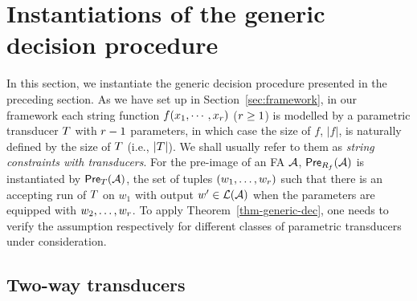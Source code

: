 
\section{Instantiations of the generic decision procedure}\label{sec-instan}

In this section, we instantiate the generic decision procedure presented in the preceding section. 
As we have set up in Section~\ref{sec:framework}, in our framework %
each string function $f(x_1, \cdots, x_r)$ ($r\geq 1$) is modelled by a parametric transducer $T$  
with $r-1$ parameters, in which case the size of $f$, $|f|$, is naturally defined by the size of $T$ (i.e., $|T|$). We shall usually refer to them as \emph{string constraints with transducers}. For the pre-image of an FA $\mathcal{A}$,  $\textsf{Pre}_{R_f}(\mathcal{A})$ is instantiated by $\textsf{Pre}_{T}(\mathcal{A})$, the set of tuples $(w_1,\ldots, w_r)$ such that there is an accepting run of $T$ on $w_1$ with output $w'\in \mathcal{L}(\mathcal{A})$ when the parameters are equipped with $w_2,\ldots, w_r$. To apply Theorem~\ref{thm-generic-dec}, one needs to verify the \prerec{} assumption respectively for different classes of parametric transducers under consideration. 



 
\subsection{Two-way transducers}\label{sec-2way}



